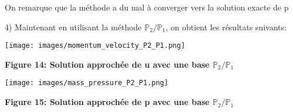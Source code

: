 \documentclass{article}
\begin{document}
On remarque que la méthode a du mal à converger vers la solution exacte de p

4) Maintenant en utilisant la méthode $\mathbb{P}_2/\mathbb{P}_1$, on obtient les résultats suivants:

\texttt{[image: images/momentum\_velocity\_P2\_P1.png]}
\begin{center}
    \textbf{Figure 14: Solution approchée de u avec une base $\mathbb{P}_2/\mathbb{P}_1$}
\end{center}

\texttt{[image: images/mass\_pressure\_P2\_P1.png]}
\begin{center}
    \textbf{Figure 15: Solution approchée de p avec une base $\mathbb{P}_2/\mathbb{P}_1$}
\end{center}
\end{document}
